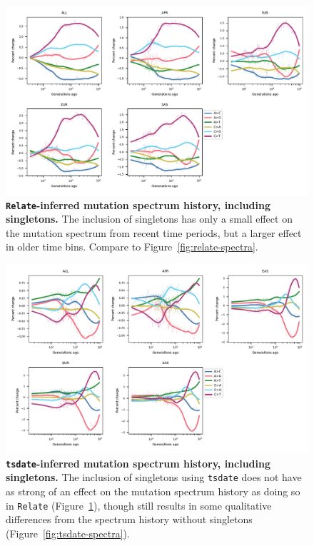 \documentclass[]{article}
\newcommand{\tsdate}{\texttt{tsdate}\xspace}
\newcommand{\relate}{\texttt{Relate}\xspace}
\begin{document}
\begin{figure}[ht!]
    \centering
    \includegraphics[width=\textwidth]{../plots/spectrum_history.relate.max_age.10000.singletons.pdf}
    \caption{
        \textbf{\relate-inferred mutation spectrum history, including singletons.}
        The inclusion of singletons has only a small effect on the mutation spectrum from
        recent time periods, but a larger effect in older time bins.
        Compare to Figure~\ref{fig:relate-spectra}.
    }
    \label{fig:relate-spectra-singletons}
\end{figure}


\begin{figure}[ht!]
    \centering
    \includegraphics[width=\textwidth]{../plots/spectrum_history.tsdate.max_age.10000.singletons.pdf}
    \caption{
        \textbf{\tsdate-inferred mutation spectrum history, including singletons.}
        The inclusion of singletons using \tsdate does not have as strong of an effect
        on the mutation spectrum history as doing so in \relate
        (Figure~\ref{fig:relate-spectra-singletons}), though still results in some
        qualitative differences from the spectrum history without singletons
        (Figure~\ref{fig:tsdate-spectra}).
    }
    \label{fig:tsdate-spectra-singletons}
\end{figure}
\end{document}
